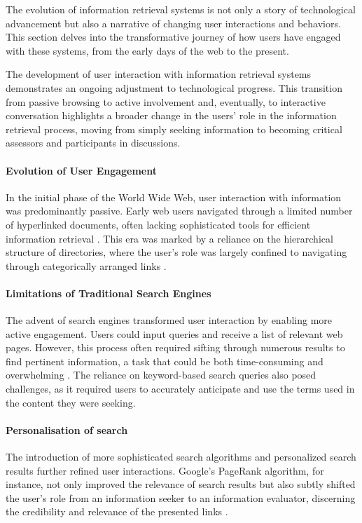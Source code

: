 \documentclass{article}
\begin{document}
The evolution of information retrieval systems is not only a story of technological advancement but also a narrative of changing user interactions and behaviors. This section delves into the transformative journey of how users have engaged with these systems, from the early days of the web to the present.

The development of user interaction with information retrieval systems demonstrates an ongoing adjustment to technological progress. This transition from passive browsing to active involvement and, eventually, to interactive conversation highlights a broader change in the users' role in the information retrieval process, moving from simply seeking information to becoming critical assessors and participants in discussions.

\paragraph{Evolution of User Engagement} In the initial phase of the World Wide Web, user interaction with information was predominantly passive. Early web users navigated through a limited number of hyperlinked documents, often lacking sophisticated tools for efficient information retrieval \citep{nielsen1999user}. This era was marked by a reliance on the hierarchical structure of directories, where the user's role was largely confined to navigating through categorically arranged links \citep{koster1994aliweb}.

\paragraph{Limitations of Traditional Search Engines} The advent of search engines transformed user interaction by enabling more active engagement. Users could input queries and receive a list of relevant web pages. However, this process often required sifting through numerous results to find pertinent information, a task that could be both time-consuming and overwhelming \citep{marchionini2006exploratory}. The reliance on keyword-based search queries also posed challenges, as it required users to accurately anticipate and use the terms used in the content they were seeking.

\paragraph{Personalisation of search} The introduction of more sophisticated search algorithms and personalized search results further refined user interactions. Google's PageRank algorithm, for instance, not only improved the relevance of search results but also subtly shifted the user's role from an information seeker to an information evaluator, discerning the credibility and relevance of the presented links \citep{brin1998anatomy}.
\end{document}

